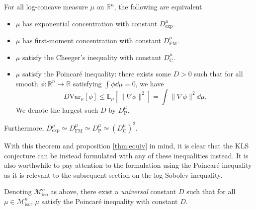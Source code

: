 \begin{theorem}\label{thm:milman2}
  For all log-concave measure \(\mu\) on \(\mathbb{R}^n\), the following are equivalent
  \begin{itemize}
    \item \(\mu\) has exponential concentration with constant \(D^\mu_\text{exp}\).
    \item \(\mu\) has first-moment concentration with constant \(D^\mu_\text{FM}\).
    \item \(\mu\) satisfy the Cheeger's inequality with constant \(D^\mu_\text{C}\).
    \item \(\mu\) satisfy the Poincaré inequality: there exists some \(D > 0\) such that for all 
      smooth \(\phi : \mathbb{R}^n \to \mathbb{R}\) satisfying \(\int \phi \dd\mu = 0\), we have
      \[D \text{Var}_\mu[\phi] \le \mathbb{E}_\mu[\|\nabla \phi\|^2] = \int \|\nabla \phi\|^2 \dd\mu.\]
      We denote the largest such \(D\) by \(D^\mu_{\text{P}}\).
  \end{itemize}
  Furthermore, \(D^\mu_{\text{exp}} \simeq D^\mu_{\text{FM}} \simeq D^\mu_{\text{P}} \simeq (D^\mu_{\text{C}})^2\).
\end{theorem}

With this theorem and proposition \ref{thm:equiv} in mind, it is clear that the KLS conjecture can be 
instead formulated with any of these inequalities instead. It is also worthwhile to pay attention to the 
formulation using the Poincaré inequality as it is relevant to the subsequent section on the log-Sobolev 
inequality.

\begin{conjecture}
  Denoting \(\mathscr{M}^n_{\text{iso}}\) as above, there exist a \textit{universal} constant \(D\) 
  such that for all \(\mu \in \mathscr{M}^n_{\text{iso}}\), \(\mu\) satisfy the Poincaré inequality 
  with constant \(D\).
\end{conjecture}


